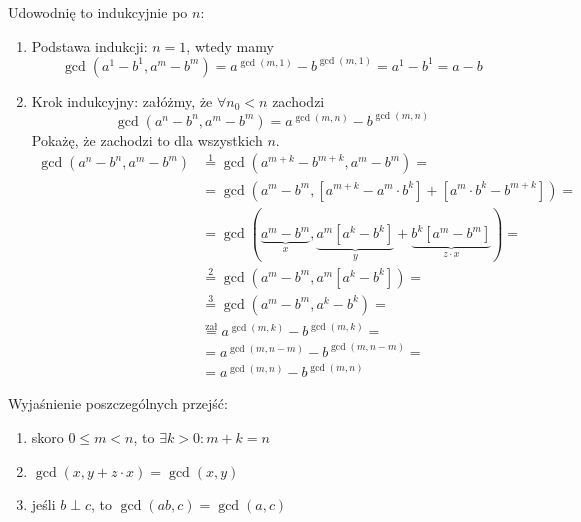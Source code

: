 \documentclass[a4paper,12pt]{article}
\begin{document}
\noindent Udowodnię to indukcyjnie po $n$:
\begin{enumerate}
\item Podstawa indukcji: $n = 1$, wtedy mamy 
$$\gcd(a^1 - b^1, a^m - b^m) = a^{\gcd(m, 1)} - b^{\gcd(m, 1)} = a^1 - b^1 = a - b$$
\item Krok indukcyjny: załóżmy, że $\forall n_0 < n$ zachodzi 
$$\gcd(a^n - b^n, a^m - b^m) = a^{\gcd(m, n)} - b^{\gcd(m, n)}$$
Pokażę, że zachodzi to dla wszystkich $n$.
$$
\begin{aligned}
\gcd(a^n - b^n, a^m - b^m) &\stackrel{1}{=} \gcd(a^{m+k} - b^{m+k}, a^m - b^m) = \\
					&= \gcd(a^m - b^m, [a^{m+k} - a^m\cdot b^k] + [a^m\cdot b^k - b^{m+k}]) = \\
					&= \gcd(\underbrace{a^m - b^m}_{x}, \underbrace{a^m[a^k-b^k]}_{y} + \underbrace{b^k[a^m-b^m]}_{z\cdot x}) = \\
					&\stackrel{2}{=} \gcd(a^m - b^m, a^m[a^k-b^k]) = \\
					&\stackrel{3}{=} \gcd(a^m - b^m, a^k - b^k) = \\
					&\stackrel{\text{zał}}{=} a^{\gcd(m, k)} - b^{\gcd(m, k)} = \\
					&= a^{\gcd(m, n-m)} - b^{\gcd(m, n-m)} = \\
					&= a^{\gcd(m, n)} - b^{\gcd(m, n)}
\end{aligned}
$$
\end{enumerate}
Wyjaśnienie poszczególnych przejść:
\begin{enumerate}
\item skoro $0 \leq m < n$, to $\exists k > 0: m+k = n$
\item $\gcd(x, y + z\cdot x) = \gcd(x, y)$
\item jeśli $b \perp c$, to $\gcd(ab, c) = \gcd(a, c)$
\end{enumerate}
\end{document}
